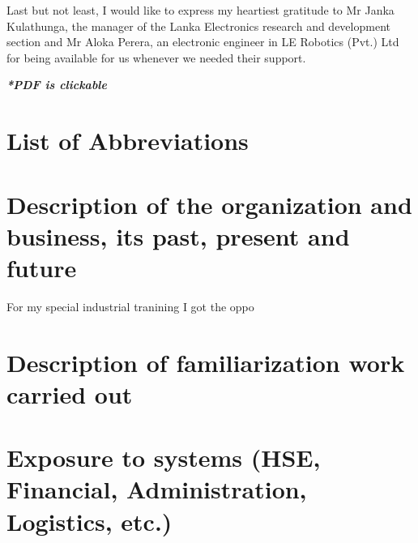 \documentclass[a4paper,12pt]{report}%
\begin{document}
Last but not least, I would like to express my heartiest gratitude to Mr Janka Kulathunga, the manager of the Lanka Electronics research and development section and Mr Aloka Perera, an electronic engineer in LE Robotics (Pvt.) Ltd for being available for us whenever we needed their support.




\tableofcontents %
\vfill
\begin{center}
	\textbf{\textit{*PDF is clickable}}
\end{center}

\chapter*{List of Abbreviations}


\listoffigures %
\listoftables %




\pagebreak

\chapter{Description of the organization and business, its past, present and	future}

For my special industrial tranining I got the oppo


\chapter{Description of familiarization work carried out}

\chapter{Exposure to systems (HSE, Financial, Administration, Logistics, etc.)}

\end{document}

